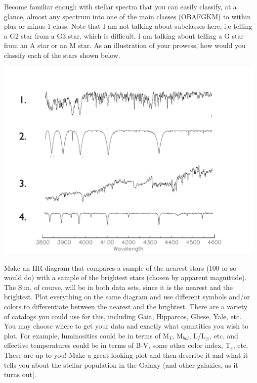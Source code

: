 \documentclass[12pt]{article}
\newenvironment{problem}[2][Problem]{\begin{trivlist}
\item[\hskip \labelsep {\bfseries #1}\hskip \labelsep {\bfseries #2.}]}{\end{trivlist}}
\newenvironment{answer}[2][Answer]{\begin{trivlist}
\item[\hskip \labelsep {\bfseries #1}\hskip \labelsep {\bfseries #2.}]}{\end{trivlist}}
\begin{document}
\begin{problem}{2} Become familiar enough with stellar spectra that you can easily classify, at a glance, almost any spectrum into one of the main classes (OBAFGKM) to within plus or minus 1 class. Note that I am not talking about subclasses here, i.e telling a G2 star from a G3 star, which is difficult. I am talking about telling a G star from an A star or an M star. As an illustration of your prowess, how would you classify each of the stars shown below.

\includegraphics [scale=0.3] {UnknownSpectra.pdf}
\end{problem}

\begin{answer}{2}
\end{answer}



\begin{problem}{3}
  Make an HR diagram that compares a sample of the nearest stars (100 or so would do) with a sample of the brightest stars (chosen by apparent magnitude). The Sun, of course, will be in both data sets, since it is the nearest and the brightest. Plot everything on the same diagram and use different symbols and/or colors to differentiate between the nearest and the brightest. There are a variety of catalogs you could use for this, including Gaia, Hipparcos, Gliese, Yale, etc. You may choose where to get your data and exactly what quantities you wish to plot. For example, luminosities could be in terms of M$_V$, M$_{bol}$, L/L$_\odot$, etc. and effective temperatures could be in terms of B-V, some other color index, T$_e$, etc. These are up to you! Make a great looking plot and then describe it and what it tells you about the stellar population in the Galaxy (and other galaxies, as it turns out).

\end{problem}
\end{document}
